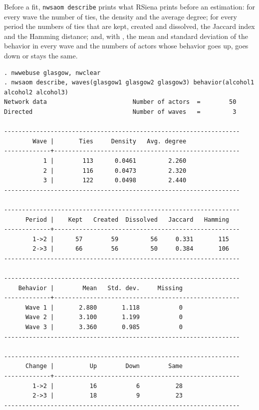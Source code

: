 Before a fit, \texttt{nwsaom describe} prints what RSiena prints before an estimation: for every wave the number of ties, the density and the average degree; for every period the numbers of ties that are kept, created and dissolved, the Jaccard index and the Hamming distance; and, with , the mean and standard deviation of the behavior in every wave and the numbers of actors whose behavior goes up, goes down or stays the same.
\begin{lstlisting}
. nwwebuse glasgow, nwclear
. nwsaom describe, waves(glasgow1 glasgow2 glasgow3) behavior(alcohol1 alcohol2 alcohol3)
Network data                        Number of actors  =        50
Directed                            Number of waves   =         3

------------------------------------------------------------------
        Wave |       Ties     Density   Avg. degree
-------------+----------------------------------------------------
           1 |        113      0.0461         2.260
           2 |        116      0.0473         2.320
           3 |        122      0.0498         2.440
------------------------------------------------------------------

------------------------------------------------------------------
      Period |    Kept   Created  Dissolved   Jaccard   Hamming
-------------+----------------------------------------------------
        1->2 |      57        59         56     0.331       115
        2->3 |      66        56         50     0.384       106
------------------------------------------------------------------

------------------------------------------------------------------
    Behavior |        Mean   Std. dev.     Missing
-------------+----------------------------------------------------
      Wave 1 |       2.880       1.118           0
      Wave 2 |       3.100       1.199           0
      Wave 3 |       3.360       0.985           0
------------------------------------------------------------------

------------------------------------------------------------------
      Change |          Up        Down        Same
-------------+----------------------------------------------------
        1->2 |          16           6          28
        2->3 |          18           9          23
------------------------------------------------------------------
\end{lstlisting}
